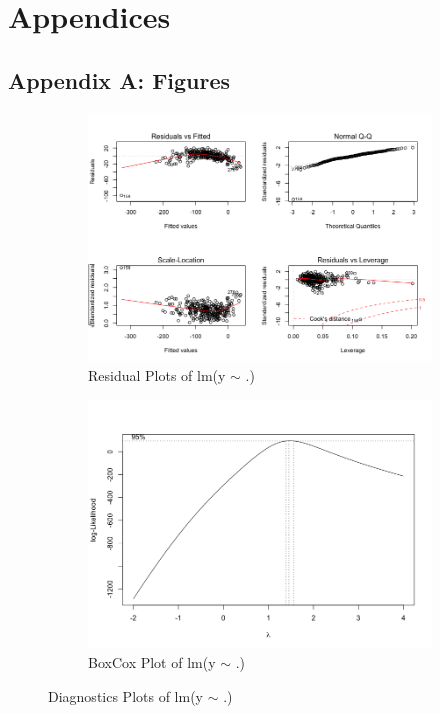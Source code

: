 \documentclass[11pt a4paper]{article}
\begin{document}
\nocite*{}  




\newpage
\section*{Appendices}

\subsection*{Appendix A: Figures}

\begin{figure}[H]
	\centering
	\begin{subfigure}{.7\textwidth}
		\centering
		\includegraphics[scale=0.4]{resid-m0.png}
		\caption{Residual Plots of lm(y $\sim$ .)}
		\label{fig:resid-m0}
	\end{subfigure}%
	\begin{subfigure}{.3\textwidth}
		\centering
		\includegraphics[scale=0.2]{boxcox-m0.png}
		\caption{BoxCox Plot of lm(y $\sim$ .)}
		\label{fig:boxcox-m0}
	\end{subfigure}
	\caption{Diagnostics Plots of lm(y $\sim$ .)}
	\label{fig:diagnostics-m0}
\end{figure}
\end{document}
